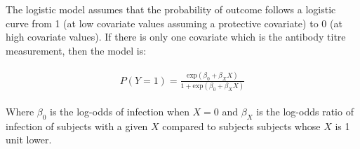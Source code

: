 The logistic model assumes that the probability of outcome follows a logistic curve from 1 (at low covariate values assuming a protective covariate) to 0 (at high covariate values). If there is only one covariate which is the antibody titre measurement, then the model is:

\begin{align*}
\begin{gathered}
P(Y=1) = \frac{\text{exp}(\beta_0 + \beta_X X)}{1 + \text{exp}(\beta_0 + \beta_X X)}
\end{gathered}
\end{align*}

Where $\beta_0$ is the log-odds of infection when $X=0$ and $\beta_X$ is the log-odds ratio of infection of subjects with a given $X$ compared to subjects subjects whose $X$ is 1 unit lower.
